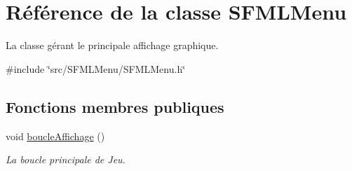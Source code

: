 \hypertarget{class_s_f_m_l_menu}{}\section{Référence de la classe S\+F\+M\+L\+Menu}
\label{class_s_f_m_l_menu}


La classe gérant le principale affichage graphique.  




{\ttfamily \#include \char`\"{}src/\+S\+F\+M\+L\+Menu/\+S\+F\+M\+L\+Menu.\+h\char`\"{}}

\subsection*{Fonctions membres publiques}
\begin{DoxyCompactItemize}
\item 
void \hyperlink{class_s_f_m_l_menu_ab7eeb1a042f076ec28ce301c1d8d3660}{boucle\+Affichage} ()
\begin{DoxyCompactList}\small\item\em La boucle principale de Jeu. \end{DoxyCompactList}\end{DoxyCompactItemize}
